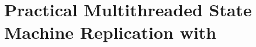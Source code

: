 \newcommand{\smr}[0]{SMR\xspace}
\newcommand{\ldpreload}[0]{LD\_PRELOAD\xspace}
\newcommand{\mutexlock}[0]{\texttt{pthread\_mutex\_lock}\xspace}
\newcommand{\send}[0]{\texttt{send}\xspace}
\newcommand{\accept}[0]{\texttt{accept}\xspace}
\newcommand{\connect}[0]{\texttt{connect}\xspace}
\newcommand{\recv}[0]{\texttt{recv}\xspace}
\newcommand{\sockread}[0]{\texttt{read}\xspace}
\newcommand{\close}[0]{\texttt{close}\xspace}
\newcommand{\select}[0]{\texttt{select}\xspace}
\newcommand{\poll}[0]{\texttt{poll}\xspace}
\newcommand{\epoll}[0]{\texttt{epoll}\xspace}
\newcommand{\randfunc}[0]{\texttt{rand}\xspace}
\newcommand{\srandfunc}[0]{\texttt{srand}\xspace}
\newcommand{\gettimeofday}[0]{\texttt{gettimeofday}\xspace}

\chapter{Practical Multithreaded State Machine Replication with \smt} \label{sec:crane}









